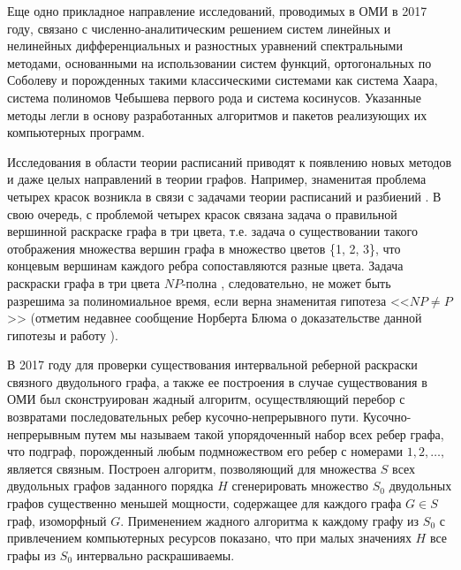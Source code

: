


Еще одно прикладное направление исследований, проводимых в ОМИ в 2017 году, связано с численно-аналитическим решением систем линейных и нелинейных дифференциальных и разностных уравнений  спектральными методами, основанными на использовании систем функций, ортогональных по Соболеву и порожденных такими классическими системами как система Хаара, система полиномов Чебышева первого рода и система косинусов. Указанные методы легли в основу разработанных алгоритмов и пакетов реализующих их компьютерных программ.


















Исследования в области теории расписаний приводят к появлению новых методов и даже целых
направлений в теории графов. Например, знаменитая проблема четырех красок возникла в связи с задачами теории расписаний
и разбиений \cite[c. 101]{AKM_ch1_bib1}. В свою очередь, с проблемой четырех красок связана задача о правильной вершинной раскраске
графа в три цвета, т.е. задача о существовании такого отображения множества вершин графа в множество цветов \{1, 2,
3\}, что концевым вершинам каждого ребра сопоставляются разные цвета. Задача раскраски графа в три цвета
$\mathit{NP}${}-полна \cite[c. 101]{AKM_ch1_bib1}, следовательно, не может быть разрешима за полиномиальное время, если верна знаменитая
гипотеза <<$NP\neq P$>> (отметим недавнее сообщение Норберта Блюма о доказательстве данной гипотезы \cite{AKM_ch1_bib2} и
работу \cite{AKM_ch1_bib3}).

В 2017 году для проверки существования интервальной реберной раскраски связного двудольного графа, а также ее построения в случае существования в ОМИ был сконструирован жадный алгоритм, осуществляющий перебор с возвратами последовательных ребер кусочно-непрерывного пути. Кусочно-непрерывным путем мы называем такой упорядоченный набор всех ребер графа, что подграф, порожденный любым подмножеством его ребер с номерами $1, 2, \ldots,$ является связным.
Построен алгоритм, позволяющий для множества $S$ всех двудольных графов заданного порядка $H$ сгенерировать множество $S_0$ двудольных графов существенно меньшей мощности, содержащее для каждого графа $G \in S$ граф, изоморфный  $G$. Применением жадного алгоритма к	каждому графу из $S_0$ с привлечением компьютерных ресурсов показано, что при малых значениях $H$ все графы из $S_0$ интервально раскрашиваемы.
	
